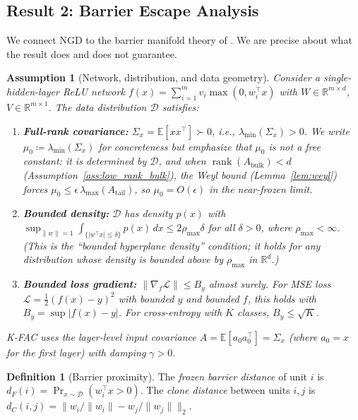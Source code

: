 \documentclass{article}
\providecommand{\R}{\mathbb{R}}
\providecommand{\E}{\mathbb{E}}
\providecommand{\norm}[1]{\lVert #1 \rVert}
\DeclareMathOperator{\rank}{rank}
\theoremstyle{plain}
\newtheorem{assumption}{Assumption}
\theoremstyle{definition}
\newtheorem{definition}{Definition}
\theoremstyle{remark}
\begin{document}
\subsection{Result 2: Barrier Escape Analysis}
\label{sec:barrier}

We connect NGD to the barrier manifold theory of \citet{joudaki2026barriers}. We are precise about what the result does and does not guarantee.

\begin{assumption}[Network, distribution, and data geometry]
\label{ass:barrier}
Consider a single-hidden-layer ReLU network $f(x) = \sum_{i=1}^m v_i\max(0,w_i^\top x)$ with $W \in \R^{m \times d}$, $V \in \R^{m \times 1}$. The data distribution $\mathcal{D}$ satisfies:
\begin{enumerate}
    \item[(D1)] \textbf{Full-rank covariance:} $\Sigma_x = \E[xx^\top] \succ 0$, i.e., $\lambda_{\min}(\Sigma_x) > 0$. We write $\mu_0 \coloneqq \lambda_{\min}(\Sigma_x)$ for concreteness but emphasize that \emph{$\mu_0$ is not a free constant}: it is determined by $\mathcal{D}$, and when $\rank(A_{\mathrm{bulk}}) < d$ (Assumption~\ref{ass:low_rank_bulk}), the Weyl bound (Lemma~\ref{lem:weyl}) forces $\mu_0 \leq \epsilon\,\lambda_{\max}(A_{\mathrm{tail}})$, so $\mu_0 = O(\epsilon)$ in the near-frozen limit.
    \item[(D2)] \textbf{Bounded density:} $\mathcal{D}$ has density $p(x)$ with $\sup_{\norm{w}=1} \int_{\{|w^\top x| \leq \delta\}} p(x)\,dx \leq 2\rho_{\max}\delta$ for all $\delta > 0$, where $\rho_{\max} < \infty$. (This is the ``bounded hyperplane density'' condition; it holds for any distribution whose density is bounded above by $\rho_{\max}$ in $\R^d$.)
    \item[(D3)] \textbf{Bounded loss gradient:} $\norm{\nabla_f\mathcal{L}} \leq B_y$ almost surely. For MSE loss $\mathcal{L} = \frac{1}{2}(f(x)-y)^2$ with bounded $y$ and bounded $f$, this holds with $B_y = \sup|f(x)-y|$. For cross-entropy with $K$ classes, $B_y \leq \sqrt{K}$.
\end{enumerate}
K-FAC uses the layer-level input covariance $A = \E[a_0 a_0^\top] = \Sigma_x$ (where $a_0 = x$ for the first layer) with damping $\gamma > 0$.
\end{assumption}

\begin{definition}[Barrier proximity]
\label{def:barrier_prox}
The \emph{frozen barrier distance} of unit $i$ is $d_F(i) = \Pr_{x \sim \mathcal{D}}(w_i^\top x > 0)$. The \emph{clone distance} between units $i, j$ is $d_C(i,j) = \norm{w_i/\norm{w_i} - w_j/\norm{w_j}}_2$.
\end{definition}
\end{document}
